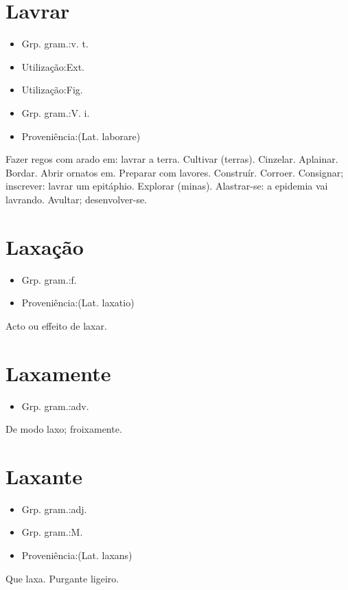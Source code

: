 \section{Lavrar}
\begin{itemize}
\item {Grp. gram.:v. t.}
\end{itemize}
\begin{itemize}
\item {Utilização:Ext.}
\end{itemize}
\begin{itemize}
\item {Utilização:Fig.}
\end{itemize}
\begin{itemize}
\item {Grp. gram.:V. i.}
\end{itemize}
\begin{itemize}
\item {Proveniência:(Lat. \textunderscore laborare\textunderscore )}
\end{itemize}
Fazer regos com arado em: \textunderscore lavrar a terra\textunderscore .
Cultivar (terras).
Cinzelar.
Aplainar.
Bordar.
Abrir ornatos em.
Preparar com lavores.
Construír.
Corroer.
Consignar; inscrever: \textunderscore lavrar um epitáphio\textunderscore .
Explorar (minas).
Alastrar-se: \textunderscore a epidemia vai lavrando\textunderscore .
Avultar; desenvolver-se.
\section{Laxação}
\begin{itemize}
\item {Grp. gram.:f.}
\end{itemize}
\begin{itemize}
\item {Proveniência:(Lat. \textunderscore laxatio\textunderscore )}
\end{itemize}
Acto ou effeito de laxar.
\section{Laxamente}
\begin{itemize}
\item {Grp. gram.:adv.}
\end{itemize}
De modo laxo; froixamente.
\section{Laxante}
\begin{itemize}
\item {Grp. gram.:adj.}
\end{itemize}
\begin{itemize}
\item {Grp. gram.:M.}
\end{itemize}
\begin{itemize}
\item {Proveniência:(Lat. \textunderscore laxans\textunderscore )}
\end{itemize}
Que laxa.
Purgante ligeiro.
